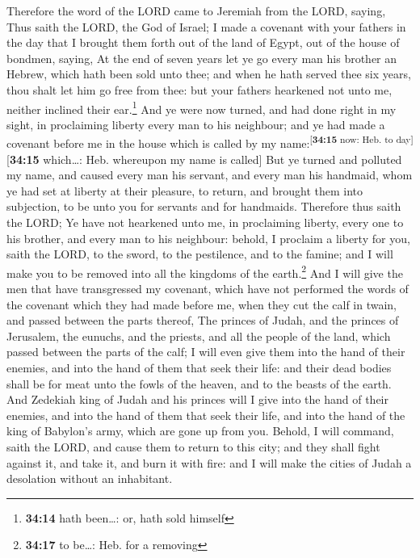  Therefore the word of the LORD came to Jeremiah from the
LORD, saying,  Thus saith the LORD, the God of Israel; I
made a covenant with your fathers in the day that I brought them forth
out of the land of Egypt, out of the house of bondmen, saying,
 At the end of seven years let ye go every man his
brother an Hebrew, which hath been sold unto thee; and when he hath
served thee six years, thou shalt let him go free from thee: but your
fathers hearkened not unto me, neither inclined their ear.\footnote{\textbf{34:14}
  hath been\ldots: or, hath sold himself}  And ye were
now turned, and had done right in my sight, in proclaiming liberty every
man to his neighbour; and ye had made a covenant before me in the house
which is called by my name:\textsuperscript{{[}\textbf{34:15} now: Heb.
to day{]}}{[}\textbf{34:15} which\ldots: Heb. whereupon my name is
called{]}  But ye turned and polluted my name, and caused
every man his servant, and every man his handmaid, whom ye had set at
liberty at their pleasure, to return, and brought them into subjection,
to be unto you for servants and for handmaids.  Therefore
thus saith the LORD; Ye have not hearkened unto me, in proclaiming
liberty, every one to his brother, and every man to his neighbour:
behold, I proclaim a liberty for you, saith the LORD, to the sword, to
the pestilence, and to the famine; and I will make you to be removed
into all the kingdoms of the earth.\footnote{\textbf{34:17} to be\ldots:
  Heb. for a removing}  And I will give the men that have
transgressed my covenant, which have not performed the words of the
covenant which they had made before me, when they cut the calf in twain,
and passed between the parts thereof,  The princes of
Judah, and the princes of Jerusalem, the eunuchs, and the priests, and
all the people of the land, which passed between the parts of the calf;
 I will even give them into the hand of their enemies,
and into the hand of them that seek their life: and their dead bodies
shall be for meat unto the fowls of the heaven, and to the beasts of the
earth.  And Zedekiah king of Judah and his princes will I
give into the hand of their enemies, and into the hand of them that seek
their life, and into the hand of the king of Babylon's army, which are
gone up from you.  Behold, I will command, saith the
LORD, and cause them to return to this city; and they shall fight
against it, and take it, and burn it with fire: and I will make the
cities of Judah a desolation without an inhabitant.

